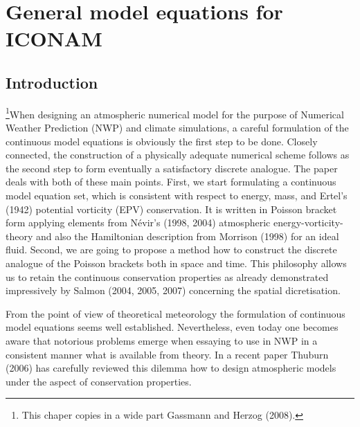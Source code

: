 %

\chapter{General model equations for ICONAM}

\section{Introduction}

\footnote{This chaper copies in a wide part Gassmann and Herzog (2008).}When designing an atmospheric numerical model for the purpose of Numerical Weather Prediction (NWP) and climate simulations, a careful formulation of the continuous model equations is obviously the first step to be done. Closely connected, the construction of a physically adequate numerical scheme follows as the second step to form eventually a satisfactory discrete analogue. The paper deals with both of these main points. First, we start formulating a continuous model equation set, which is consistent with respect to energy, mass, and Ertel's (1942) potential vorticity (EPV) conservation. It is written in Poisson bracket form applying elements from N\'evir's (1998, 2004) atmospheric energy-vorticity-theory and also the Hamiltonian description from Morrison (1998) for an ideal fluid. Second, we are going to propose a method how to construct the discrete analogue of the Poisson brackets both in space and time. This philosophy allows us to retain the continuous conservation properties as already demonstrated impressively by Salmon (2004, 2005, 2007) concerning the spatial dicretisation.

From the point of view of theoretical meteorology the formulation of continuous model equations seems well established. Nevertheless, even today one becomes aware that notorious problems emerge when essaying to use in NWP in a consistent manner what is available from theory. In a recent paper Thuburn (2006) has carefully reviewed this dilemma how to design atmospheric models under the aspect of conservation properties.

